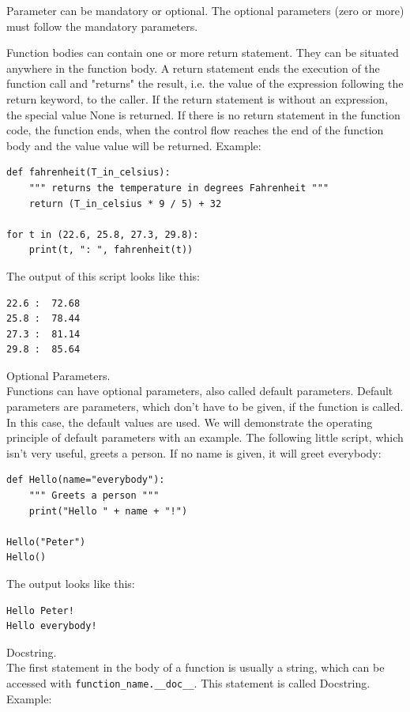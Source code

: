 \documentclass[11pt,a4paper]{article}
\begin{document}
Parameter can be mandatory or optional. The optional parameters (zero
or more) must follow the mandatory parameters.

Function bodies can contain one or more return statement. They can be
situated anywhere in the function body. A return statement ends the
execution of the function call and "returns" the result, i.e. the
value of the expression following the return keyword, to the
caller. If the return statement is without an expression, the special
value None is returned. If there is no return statement in the
function code, the function ends, when the control flow reaches the
end of the function body and the value value will be returned.
Example:

\begin{lstlisting}
def fahrenheit(T_in_celsius):
    """ returns the temperature in degrees Fahrenheit """
    return (T_in_celsius * 9 / 5) + 32

for t in (22.6, 25.8, 27.3, 29.8):
    print(t, ": ", fahrenheit(t))
\end{lstlisting}

The output of this script looks like this:
\begin{lstlisting}
22.6 :  72.68
25.8 :  78.44
27.3 :  81.14
29.8 :  85.64
\end{lstlisting}

\noindent
Optional Parameters.\\
Functions can have optional parameters, also called default
parameters. Default parameters are parameters, which don't have to be
given, if the function is called. In this case, the default values are
used. We will demonstrate the operating principle of default
parameters with an example. The following little script, which isn't
very useful, greets a person. If no name is given, it will greet
everybody:

\begin{lstlisting}
def Hello(name="everybody"):
    """ Greets a person """
    print("Hello " + name + "!")

Hello("Peter")
Hello()
\end{lstlisting}

\noindent
The output looks like this:

\begin{lstlisting}
Hello Peter!
Hello everybody!
\end{lstlisting}

\noindent
Docstring.\\
The first statement in the body of a function is usually a string, which can be accessed with {\tt function\_name.\_\_doc\_\_}. This statement is called Docstring. Example:
\end{document}
